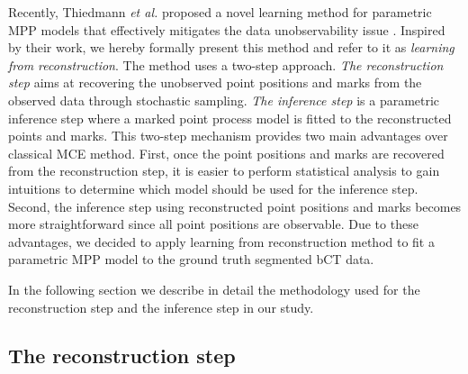 \documentclass[journal]{IEEEtran}
\begin{document}
Recently, Thiedmann \textit{et al.} proposed a novel learning method
for parametric MPP models that effectively mitigates the data
unobservability issue \cite{thiedmann2011stochastic}. Inspired by
their work, we hereby formally present this method and refer to it as
\textit{learning from reconstruction}. The method uses a two-step
approach. \textit{The reconstruction step} aims at recovering the
unobserved point positions and marks from the observed data through
stochastic sampling. \textit{The inference step} is a parametric
inference step where a marked point process model is fitted to the
reconstructed points and marks. This two-step mechanism provides two
main advantages over classical MCE method. First, once the point
positions and marks are recovered from the reconstruction step, it is
easier to perform statistical analysis to gain intuitions to determine
which model should be used for the inference step. Second, the
inference step using reconstructed point positions and marks becomes
more straightforward since all point positions are observable. Due to
these advantages, we decided to apply learning from
reconstruction method to fit a parametric MPP model to the ground
truth segmented bCT data.

In the following section we describe in detail the methodology used
for the reconstruction step and the inference step in our study.

\subsection{The reconstruction step}
\label{sec:reconstr-step:-appr}
\end{document}

